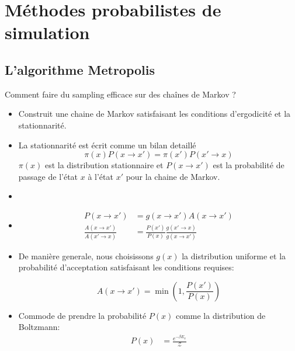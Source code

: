 \documentclass{beamer}
\begin{document}
\section{Méthodes probabilistes de simulation}

\subsection{L'algorithme Metropolis}
\begin{frame}{Comment faire du sampling efficace sur des chaînes de Markov ?}
    \begin{itemize}
        \item 
            Construit une chaine de Markov satisfaisant les conditions d'ergodicité et la stationnarité. 
        \item 
            La stationnarité est écrit comme un bilan detaillé 
            \begin{equation}
                \pi(x) P(x \rightarrow x') = \pi(x') P(x' \rightarrow x)
            \end{equation}
            $\pi(x)$ est la distribution stationnaire et $P(x \rightarrow x')$ est la probabilité de passage de l'état $x$ à l'état $x'$ pour la chaine de Markov.
        \item 
            
    \end{itemize}
\end{frame}

\begin{frame}{}
\begin{itemize}
    \item 
    \begin{align} 
        \label{derive_2}
        P(x\rightarrow x') &= g(x\rightarrow x') A(x\rightarrow x') \\
        \frac{A(x\rightarrow x')}{A(x'\rightarrow x)} &= \frac{P(x')}{P(x)}\frac{g(x'\rightarrow x)}{g(x\rightarrow x')}
    \end{align}
    
    \item 
    
    De manière generale, nous choisissons $g(x)$ la distribution uniforme et la probabilité d'acceptation satisfaisant les conditions requises: 
    
    \begin{equation}
        A(x\rightarrow x') = \min\left(1,\frac{P(x')}{P(x)}\right)
    \end{equation}
    
    \item 
    Commode de prendre la probabilité $P(x)$ comme la distribution de Boltzmann: 
    \begin{align} 
        \label{boltzmann_dist}
        P(x) &= \frac{e^{-\beta E_x}}{\mathcal{Z}} 
    \end{align}
\end{itemize}
\end{frame}
\end{document}

